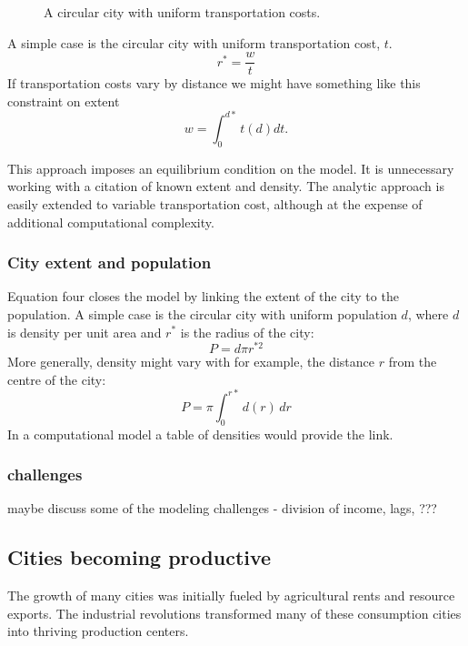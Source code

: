 \begin{figure}
    \begin{center}
    
    \caption{A circular city with uniform transportation costs.}
    \label{fig-rent-alonso}
    \end{center}
\end{figure}

A simple case is the circular city with uniform transportation cost, $t$. \[r^*= \frac{w}{t}\]%
If transportation costs vary by  distance we might have something like this constraint on extent\[w=\int_0^{d*} t(d)dt.\]

This approach imposes an equilibrium condition on the model. It is unnecessary working with a citation of known extent and density. The analytic approach is easily extended to variable transportation cost, although at the expense of additional computational complexity.

\subsubsection{City extent and population}
Equation  four  closes the model by linking the extent of the city to the population. A simple case is the circular city with uniform population $d$, where $d$ is density per unit area and $r^*$ is the radius of the city: \[P=d\pi r^{*2}\] 
More generally, density might vary with for example, the distance $r$ from the centre of the city:
\[P=\pi \int_{0}^{r*}d(r)\,dr\] 
In a computational model a table of densities would provide the link.



\subsubsection{challenges}
maybe discuss some of the modeling challenges - division of income, lags, ???

\vspace{2cm}


\subsection{Cities becoming productive}
 The growth of many cities was initially fueled by agricultural rents and resource exports. The industrial revolutions transformed many of these consumption cities into thriving production centers. 


